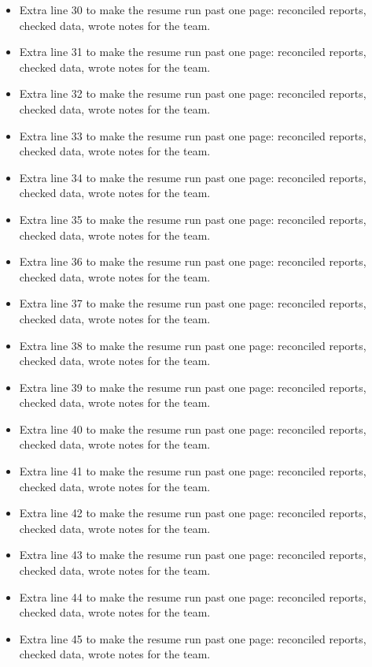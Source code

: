 \documentclass[11pt,letterpaper]{article}
\begin{document}
\begin{itemize}
  \item Extra line 30 to make the resume run past one page: reconciled reports, checked data, wrote notes for the team.
  \item Extra line 31 to make the resume run past one page: reconciled reports, checked data, wrote notes for the team.
  \item Extra line 32 to make the resume run past one page: reconciled reports, checked data, wrote notes for the team.
  \item Extra line 33 to make the resume run past one page: reconciled reports, checked data, wrote notes for the team.
  \item Extra line 34 to make the resume run past one page: reconciled reports, checked data, wrote notes for the team.
  \item Extra line 35 to make the resume run past one page: reconciled reports, checked data, wrote notes for the team.
  \item Extra line 36 to make the resume run past one page: reconciled reports, checked data, wrote notes for the team.
  \item Extra line 37 to make the resume run past one page: reconciled reports, checked data, wrote notes for the team.
  \item Extra line 38 to make the resume run past one page: reconciled reports, checked data, wrote notes for the team.
  \item Extra line 39 to make the resume run past one page: reconciled reports, checked data, wrote notes for the team.
  \item Extra line 40 to make the resume run past one page: reconciled reports, checked data, wrote notes for the team.
  \item Extra line 41 to make the resume run past one page: reconciled reports, checked data, wrote notes for the team.
  \item Extra line 42 to make the resume run past one page: reconciled reports, checked data, wrote notes for the team.
  \item Extra line 43 to make the resume run past one page: reconciled reports, checked data, wrote notes for the team.
  \item Extra line 44 to make the resume run past one page: reconciled reports, checked data, wrote notes for the team.
  \item Extra line 45 to make the resume run past one page: reconciled reports, checked data, wrote notes for the team.
\end{itemize}
\end{document}
